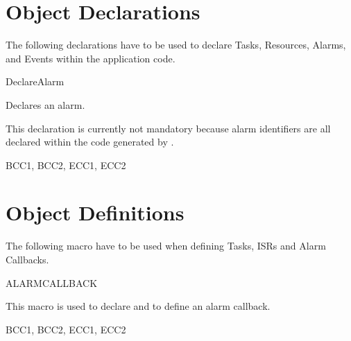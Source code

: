 \pagebreak









\section{Object Declarations}
The following declarations have to be used to declare Tasks, Resources,
Alarms, and Events within the application code.

\begin{function_nopb}{DeclareAlarm}
  \begin{fundescription}
    Declares an alarm.

    This declaration is currently not mandatory because alarm
    identifiers are all declared within the code generated by \rtd.
  \end{fundescription}
  \begin{funconformance}
    BCC1, BCC2, ECC1, ECC2
  \end{funconformance}
\end{function_nopb}


\pagebreak











\section{Object Definitions}
The following macro have to be used when defining Tasks, ISRs and
Alarm Callbacks.

\begin{function_nopb}{ALARMCALLBACK}
  \begin{fundescription}
    This macro is used to declare and to define an alarm callback.
  \end{fundescription}
  \begin{funparameters}
  \end{funparameters}
  \begin{funconformance}
    BCC1, BCC2, ECC1, ECC2
  \end{funconformance}
\end{function_nopb}

